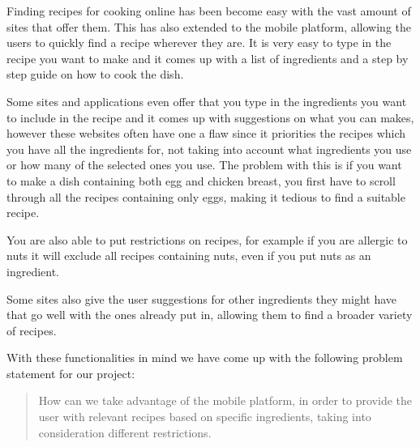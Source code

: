 Finding recipes for cooking online has been become easy with the vast amount of sites that offer them. This has also extended to the mobile platform, allowing the users to quickly find a recipe wherever they are. It is very easy to type in the recipe you want to make and it comes up with a list of ingredients and a step by step guide on how to cook the dish. 

Some sites and applications even offer that you type in the ingredients you want to include in the recipe and it comes up with suggestions on what you can makes, however these websites often have one a flaw since it priorities the recipes which you have all the ingredients for, not taking into  account what ingredients you use or how many of the selected ones you use\citep{supercook}. The problem with this is if you want to make a dish containing both egg and chicken breast, you first have to scroll through all the recipes containing only eggs, making it tedious to find a suitable recipe. 

You are also able to put restrictions on recipes, for example if you are allergic to nuts it will exclude all recipes containing nuts, even if you put nuts as an ingredient.

Some sites also give the user suggestions for other ingredients they might have that go well with the ones already put in, allowing them to find a broader variety of recipes.  

With these functionalities in mind we have come up with the following problem statement for our project:

\begin{quote}
How can we take advantage of the mobile platform, in order to provide the user with relevant recipes based on specific ingredients, taking into consideration different restrictions.
\end{quote}